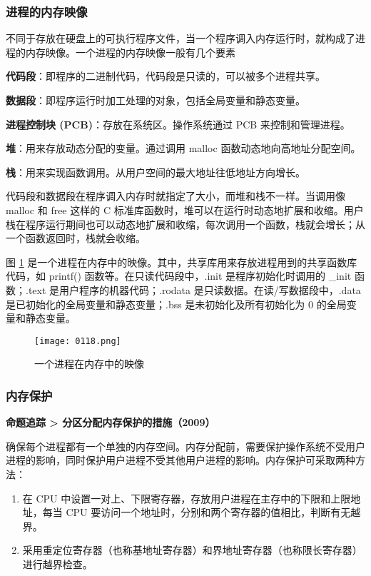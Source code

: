 \documentclass{ctexbook}
\begin{document}
	\subsubsection{进程的内存映像}
	
	不同于存放在硬盘上的可执行程序文件，当一个程序调入内存运行时，就构成了进程的内存映像。一个进程的内存映像一般有几个要素
	
	
\textbf{代码段}：即程序的二进制代码，代码段是只读的，可以被多个进程共享。
	
\textbf{数据段}：即程序运行时加工处理的对象，包括全局变量和静态变量。
	
\textbf{进程控制块 (PCB)}：存放在系统区。操作系统通过 PCB 来控制和管理进程。
	
\textbf{堆}：用来存放动态分配的变量。通过调用 malloc 函数动态地向高地址分配空间。
	
\textbf{栈}：用来实现函数调用。从用户空间的最大地址往低地址方向增长。
	
	
	代码段和数据段在程序调入内存时就指定了大小，而堆和栈不一样。当调用像 malloc 和 free 这样的 C 标准库函数时，堆可以在运行时动态地扩展和收缩。用户栈在程序运行期间也可以动态地扩展和收缩，每次调用一个函数，栈就会增长；从一个函数返回时，栈就会收缩。
	
	图 \ref{fig:process_memory_map} 是一个进程在内存中的映像。其中，共享库用来存放进程用到的共享函数库代码，如 printf() 函数等。在只读代码段中，.init 是程序初始化时调用的 \_init 函数；.text 是用户程序的机器代码；.rodata 是只读数据。在读/写数据段中，.data 是已初始化的全局变量和静态变量；.bss 是未初始化及所有初始化为 0 的全局变量和静态变量。
	
	\begin{figure}[h]
		\centering
		\texttt{[image: 0118.png]}
		\caption{一个进程在内存中的映像}
		\label{fig:process_memory_map}
	\end{figure}
	
	\subsubsection{内存保护}
	
	\textbf{命题追踪 > 分区分配内存保护的措施（2009）}
	
	确保每个进程都有一个单独的内存空间。内存分配前，需要保护操作系统不受用户进程的影响，同时保护用户进程不受其他用户进程的影响。内存保护可采取两种方法：
	
	\begin{enumerate}
		\item 在 CPU 中设置一对上、下限寄存器，存放用户进程在主存中的下限和上限地址，每当 CPU 要访问一个地址时，分别和两个寄存器的值相比，判断有无越界。
		\item 采用重定位寄存器（也称基地址寄存器）和界地址寄存器（也称限长寄存器）进行越界检查。
	\end{enumerate}
	
\end{document}
